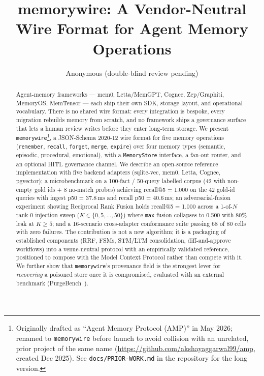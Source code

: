 \documentclass[11pt,letterpaper,twocolumn]{article}
\title{memorywire: A Vendor-Neutral Wire Format for Agent Memory Operations}
\author{Anonymous (double-blind review pending)}
\date{}
\begin{document}
\maketitle

\begin{abstract}
Agent-memory frameworks --- mem0, Letta/MemGPT, Cognee, Zep/Graphiti, MemoryOS, MemTensor --- each ship their own SDK, storage layout, and operational vocabulary. There is no shared wire format: every integration is bespoke, every migration rebuilds memory from scratch, and no framework ships a governance surface that lets a human review writes before they enter long-term storage. We present \texttt{memorywire}\footnote{Originally drafted as ``Agent Memory Protocol (AMP)'' in May 2026; renamed to \texttt{memorywire} before launch to avoid collision with an unrelated, prior project of the same name (\url{https://github.com/akshayaggarwal99/amp}, created Dec 2025). See \texttt{docs/PRIOR-WORK.md} in the repository for the long version.}, a JSON-Schema 2020-12 wire format for five memory operations (\texttt{remember}, \texttt{recall}, \texttt{forget}, \texttt{merge}, \texttt{expire}) over four memory types (semantic, episodic, procedural, emotional), with a \texttt{MemoryStore} interface, a fan-out router, and an optional HITL governance channel. We describe an open-source reference implementation with five backend adapters (sqlite-vec, mem0, Letta, Cognee, pgvector); a microbenchmark on a 100-fact / 50-query labelled corpus (42 with non-empty gold ids + 8 no-match probes) achieving recall@5 = 1.000 on the 42 gold-id queries with ingest p50 = 37.8\,ms and recall p50 = 40.6\,ms; an adversarial-fusion experiment showing Reciprocal Rank Fusion holds recall@5 = 1.000 across a 1-of-$N$ rank-0 injection sweep ($K \in \{0,5,\dots,50\}$) where \texttt{max} fusion collapses to 0.500 with 80\% leak at $K \geq 5$; and a 16-scenario cross-adapter conformance suite passing 68 of 80 cells with zero failures. The contribution is not a new algorithm; it is a packaging of established components (RRF, FSMs, STM/LTM consolidation, diff-and-approve workflows) into a venue-neutral protocol with an empirically validated reference, positioned to compose with the Model Context Protocol rather than compete with it. We further show that \texttt{memorywire}'s provenance field is the strongest lever for \emph{recovering} a poisoned store once it is compromised, evaluated with an external benchmark (PurgeBench~\cite{purgebench}).
\end{abstract}
\end{document}
